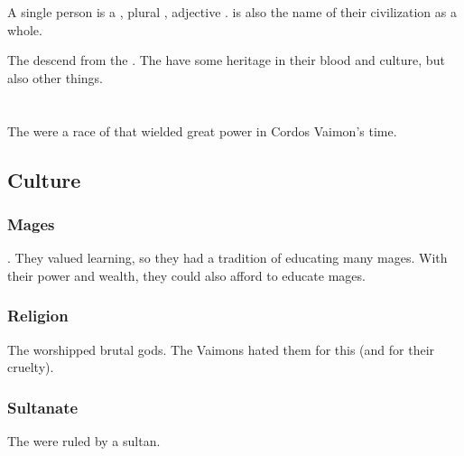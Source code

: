 A single person is a \quo{\Masthen}, plural \quo{\Masthenon}, adjective \quo{\Mastheno}. 
 is also the name of their civilization as a whole. 

The  descend from the \Masthenon. 
The  have some \Masthenon{} heritage in their blood and culture, but also other things. 















\section[Sarun]{\Sarun}
\index{\Sarun}
The \Saruns were a race of \humans that wielded great power in Cordos Vaimon's time. 









\subsection{Culture}





\subsubsection{Mages}
\Saruns {}. 
They valued learning, so they had a tradition of educating many mages.
With their power and wealth, they could also afford to educate mages. 





\subsubsection{Religion}
The \Saruns worshipped brutal \draconian gods.
The Vaimons hated them for this (and for their cruelty). 





\subsubsection{Sultanate}
The \Saruns were ruled by a sultan.









